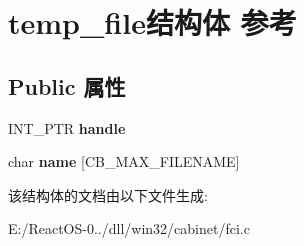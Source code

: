 \hypertarget{structtemp__file}{}\section{temp\+\_\+file结构体 参考}
\label{structtemp__file}
\subsection*{Public 属性}
\begin{DoxyCompactItemize}
\item 
\mbox{\label{structtemp__file_a5f153c3737e080ec5177a86d867fd45f}} 
I\+N\+T\+\_\+\+P\+TR {\bfseries handle}
\item 
\mbox{\label{structtemp__file_aa3193e193ab94440ae9e3abc21920c6e}} 
char {\bfseries name} \mbox{[}C\+B\+\_\+\+M\+A\+X\+\_\+\+F\+I\+L\+E\+N\+A\+ME\mbox{]}
\end{DoxyCompactItemize}


该结构体的文档由以下文件生成\+:\begin{DoxyCompactItemize}
\item 
E\+:/\+React\+O\+S-\/0../dll/win32/cabinet/fci.\+c\end{DoxyCompactItemize}
